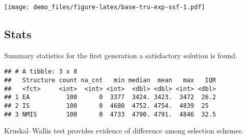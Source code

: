 \documentclass[]{book}
\newenvironment{Shaded}{\begin{snugshade}}{\end{snugshade}}
\newcommand{\CharTok}[1]{\textcolor[rgb]{0.31,0.60,0.02}{#1}}
\newcommand{\DataTypeTok}[1]{\textcolor[rgb]{0.13,0.29,0.53}{#1}}
\newcommand{\DecValTok}[1]{\textcolor[rgb]{0.00,0.00,0.81}{#1}}
\newcommand{\KeywordTok}[1]{\textcolor[rgb]{0.13,0.29,0.53}{\textbf{#1}}}
\newcommand{\NormalTok}[1]{#1}
\newcommand{\OperatorTok}[1]{\textcolor[rgb]{0.81,0.36,0.00}{\textbf{#1}}}
\newcommand{\OtherTok}[1]{\textcolor[rgb]{0.56,0.35,0.01}{#1}}
\newcommand{\StringTok}[1]{\textcolor[rgb]{0.31,0.60,0.02}{#1}}
\begin{document}
\texttt{[image: demo\_files/figure-latex/base-tru-exp-ssf-1.pdf]}

\hypertarget{stats}{%
\subsection{Stats}\label{stats}}

Summary statistics for the first generation a satisfactory solution is found.

\begin{Shaded}
\end{Shaded}

\begin{verbatim}
## # A tibble: 3 x 8
##   Structure count na_cnt   min median  mean   max   IQR
##   <fct>     <int>  <int> <int>  <dbl> <dbl> <int> <dbl>
## 1 EA          100      0  3377  3424. 3423.  3472  26.2
## 2 IS          100      0  4680  4752. 4754.  4839  25  
## 3 NMIS        100      0  4733  4790. 4791.  4846  32.5
\end{verbatim}

Kruskal--Wallis test provides evidence of difference among selection schemes.
\end{document}
